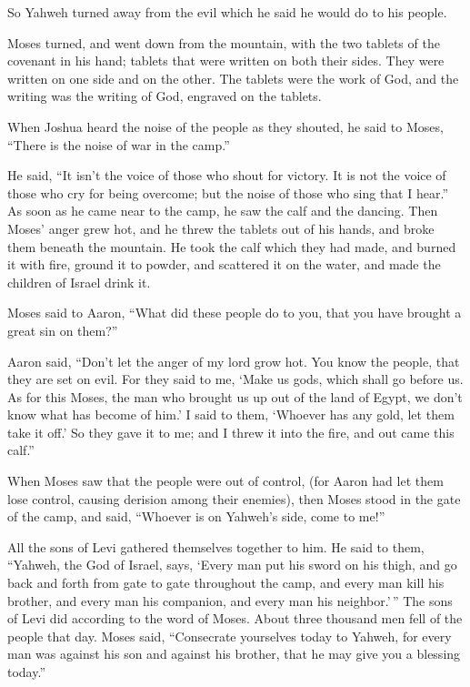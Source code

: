  So Yahweh turned away from the evil which he said he would
do to his people.

 Moses turned, and went down from the mountain, with the
two tablets of the covenant in his hand; tablets that were written on
both their sides. They were written on one side and on the other.
 The tablets were the work of God, and the writing was the
writing of God, engraved on the tablets.

 When Joshua heard the noise of the people as they shouted,
he said to Moses, ``There is the noise of war in the camp.''

 He said, ``It isn't the voice of those who shout for
victory. It is not the voice of those who cry for being overcome; but
the noise of those who sing that I hear.''  As soon as he
came near to the camp, he saw the calf and the dancing. Then Moses'
anger grew hot, and he threw the tablets out of his hands, and broke
them beneath the mountain.  He took the calf which they had
made, and burned it with fire, ground it to powder, and scattered it on
the water, and made the children of Israel drink it.

 Moses said to Aaron, ``What did these people do to you,
that you have brought a great sin on them?''

 Aaron said, ``Don't let the anger of my lord grow hot. You
know the people, that they are set on evil.  For they said
to me, `Make us gods, which shall go before us. As for this Moses, the
man who brought us up out of the land of Egypt, we don't know what has
become of him.'  I said to them, `Whoever has any gold, let
them take it off.' So they gave it to me; and I threw it into the fire,
and out came this calf.''

 When Moses saw that the people were out of control, (for
Aaron had let them lose control, causing derision among their enemies),
 then Moses stood in the gate of the camp, and said,
``Whoever is on Yahweh's side, come to me!''

All the sons of Levi gathered themselves together to him. 
He said to them, ``Yahweh, the God of Israel, says, `Every man put his
sword on his thigh, and go back and forth from gate to gate throughout
the camp, and every man kill his brother, and every man his companion,
and every man his neighbor.'\,''  The sons of Levi did
according to the word of Moses. About three thousand men fell of the
people that day.  Moses said, ``Consecrate yourselves today
to Yahweh, for every man was against his son and against his brother,
that he may give you a blessing today.''

